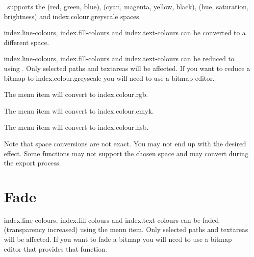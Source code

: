 
\FlowframTk\ supports the
 (red, green, blue),
 (cyan, magenta, yellow, black),
 (hue, saturation, brightness) and
\gls{index.colour.greyscale}  spaces.

\Glspl{index.line-colour}, \glspl{index.fill-colour} and
\glspl{index.text-colour} can be converted to a different
 space.


\Glspl{index.line-colour}, \glspl{index.fill-colour} and
\glspl{index.text-colour} can be reduced to
 using
.  Only selected \glspl{path} and
\glspl{textarea} will be affected. If you want to reduce a
\gls{bitmap} to \gls{index.colour.greyscale} you will need to use a
bitmap editor.


The  menu item will convert to
\gls{index.colour.rgb}.


The  menu item will convert to
\gls{index.colour.cmyk}.


The  menu item will convert to
\gls{index.colour.hsb}.

\begin{warning}
Note that  space conversions are not exact. You may
not end up with the desired effect. Some  functions
may not support the chosen  space and may convert
during the export process.
\end{warning}


\section{Fade}\label{sec:fade}


\Glspl{index.line-colour}, \glspl{index.fill-colour} and
\glspl{index.text-colour} can be faded (transparency increased)
using the  menu item. Only selected
\glspl{path} and \glspl{textarea} will be affected. If you want to
fade a \gls{bitmap} you will need to use a bitmap editor that
provides that function.

